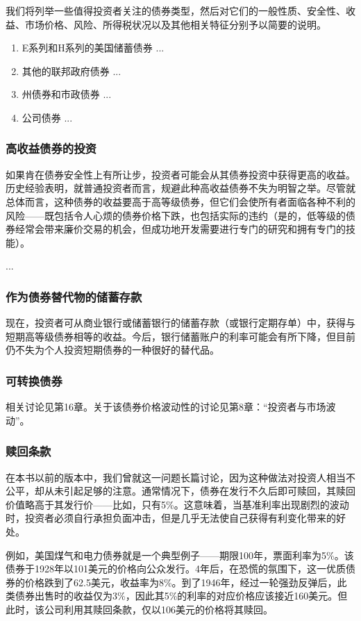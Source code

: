 \documentclass[12pt,oneside]{book}
\begin{document}
我们将列举一些值得投资者关注的债券类型，然后对它们的一般性质、安全性、收益、市场价格、风险、所得税状况以及其他相关特征分别予以简要的说明。

\begin{enumerate}
\item E系列和H系列的美国储蓄债券 ...
\item 其他的联邦政府债券 ...
\item 州债券和市政债券 ...
\item 公司债券 ...
\end{enumerate}



\subsubsection{高收益债券的投资}
如果肯在债券安全性上有所让步，投资者可能会从其债券投资中获得更高的收益。历史经验表明，就普通投资者而言，规避此种高收益债券不失为明智之举。尽管就总体而言，这种债券的收益要高于高等级债券，但它们会使所有者面临各种不利的风险——既包括令人心烦的债券价格下跌，也包括实际的违约（是的，低等级的债券经常会带来廉价交易的机会，但成功地开发需要进行专门的研究和拥有专门的技能）。

...
\subsubsection{作为债券替代物的储蓄存款}
现在，投资者可从商业银行或储蓄银行的储蓄存款（或银行定期存单）中，获得与短期高等级债券相等的收益。今后，银行储蓄账户的利率可能会有所下降，但目前仍不失为个人投资短期债券的一种很好的替代品。

\subsubsection{可转换债券}
相关讨论见第16章。关于该债券价格波动性的讨论见第8章：“投资者与市场波动”。

\subsubsection{赎回条款}
在本书以前的版本中，我们曾就这一问题长篇讨论，因为这种做法对投资人相当不公平，却从未引起足够的注意。通常情况下，债券在发行不久后即可赎回，其赎回价值略高于其发行价——比如，只有5\%。这意味着，当基准利率出现剧烈的波动时，投资者必须自行承担负面冲击，但是几乎无法使自己获得有利变化带来的好处。

例如，美国煤气和电力债券就是一个典型例子——期限100年，票面利率为5\%。该债券于1928年以101美元的价格向公众发行。4年后，在恐慌的氛围下，这一优质债券的价格跌到了62.5美元，收益率为8\%。到了1946年，经过一轮强劲反弹后，此类债券出售时的收益仅为3\%，因此其5\%的利率的对应价格应该接近160美元。但此时，该公司利用其赎回条款，仅以106美元的价格将其赎回。
\end{document}
